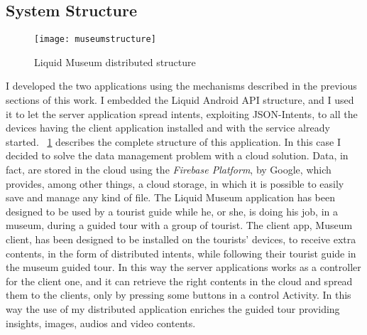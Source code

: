 \subsection{System Structure}
\begin{figure}[h]
	\centering
	\texttt{[image: museumstructure]}
	\caption{Liquid Museum distributed structure}
	\label{fig:5.10}
\end{figure}
I developed the two applications using the mechanisms described in the previous sections of this work. I embedded the Liquid Android API structure, and I used it to let the server application spread intents, exploiting JSON-Intents, to all the devices having the client application installed and with the service already started. \figurename~\ref{fig:5.10} describes the complete structure of this application. In this case I decided to solve the data management problem with a cloud solution. Data, in fact, are stored in the cloud using the \textit{Firebase Platform}, by Google, which provides, among other things, a cloud storage, in which it is possible to easily save and manage any kind of file. The Liquid Museum application has been designed to be used by a tourist guide while he, or she, is doing his job, in a museum, during a guided tour with a group of tourist. The client app, Museum client, has been designed to be installed on the tourists' devices, to receive extra contents, in the form of distributed intents, while following their tourist guide in the museum guided tour. In this way the server applications works as a controller for the client one, and it can retrieve the right contents in the cloud and spread them to the clients, only by pressing some buttons in a control Activity. In this way the use of my distributed application enriches the guided tour providing insights, images, audios and video contents.
